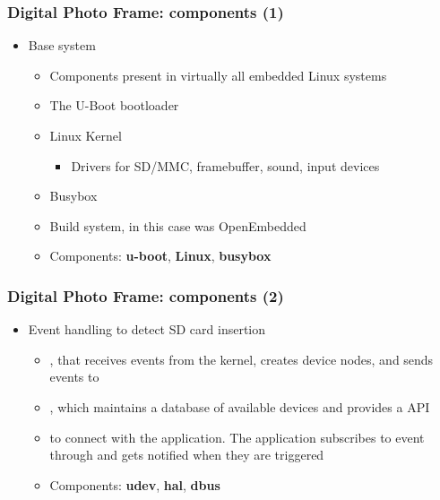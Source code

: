\begin{frame}
  \frametitle{Digital Photo Frame: components (1)}
  \begin{itemize}
  \item Base system
    \begin{itemize}
    \item Components present in virtually all embedded Linux systems
    \item The U-Boot bootloader
    \item Linux Kernel
      \begin{itemize}
      \item Drivers for SD/MMC, framebuffer, sound, input devices
      \end{itemize}
    \item Busybox
    \item Build system, in this case was OpenEmbedded
    \item Components: {\bf u-boot}, {\bf Linux}, {\bf busybox}
    \end{itemize}
  \end{itemize}
\end{frame}

\begin{frame}
  \frametitle{Digital Photo Frame: components (2)}
  \begin{itemize}
  \item Event handling to detect SD card insertion
    \begin{itemize}
    \item {}, that receives events from the kernel, creates device
      nodes, and sends events to 
    \item {}, which maintains a database of available devices and
      provides a  API
    \item {} to connect  with the application. The application
      subscribes to  event through  and gets notified when
      they are triggered
    \item Components: {\bf udev}, {\bf hal}, {\bf dbus}
    \end{itemize}
  \end{itemize}
\end{frame}


